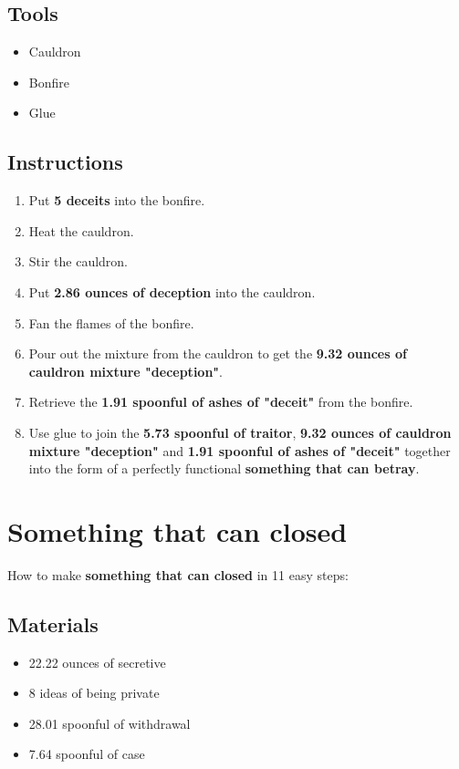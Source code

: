 \documentclass{article}
\begin{document}
\subsection{Tools}\begin{itemize}
\item 
Cauldron
\item 
Bonfire
\item 
Glue
\end{itemize}
\subsection{Instructions}\begin{enumerate}
\item 
Put \textbf{5 deceits} into the bonfire.
\item 
Heat the cauldron.
\item 
Stir the cauldron.
\item 
Put \textbf{2.86 ounces of deception} into the cauldron.
\item 
Fan the flames of the bonfire.
\item 
Pour out the mixture from the cauldron to get the \textbf{9.32 ounces of cauldron mixture "deception"}.
\item 
Retrieve the \textbf{1.91 spoonful of ashes of "deceit"} from the bonfire.
\item 
Use glue to join the \textbf{5.73 spoonful of traitor}, \textbf{9.32 ounces of cauldron mixture "deception"} and \textbf{1.91 spoonful of ashes of "deceit"} together into the form of a perfectly functional \textbf{something that can betray}.
\end{enumerate}
\newpage
\section{Something that can closed}How to make \textbf{something that can closed} in 11 easy steps:

\subsection{Materials}\begin{itemize}
\item 
22.22 ounces of secretive
\item 
8 ideas of being private
\item 
28.01 spoonful of withdrawal
\item 
7.64 spoonful of case
\end{itemize}
\end{document}
